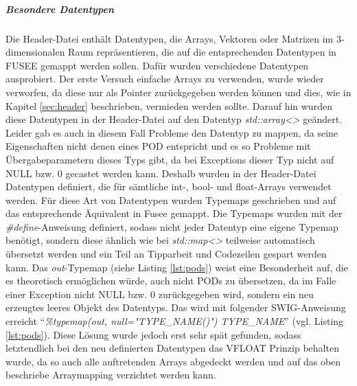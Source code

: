 \begin{code}[caption={inoreregex},label={lst:ignore}, escapechar=|]
\end{code}

\subparagraph{Besondere Datentypen} \label{besonderedatentypen}
Die Header-Datei enthält Datentypen, die Arrays, Vektoren oder Matrizen im 3-dimensionalen Raum repräsentieren, die auf die entsprechenden Datentypen in FUSEE gemappt werden sollen. Dafür wurden verschiedene Datentypen ausprobiert.
Der erste Versuch einfache Arrays zu verwenden, wurde wieder verworfen, da diese nur als Pointer zurückgegeben werden können und dies, wie in Kapitel \ref{sec:header} beschrieben, vermieden werden sollte. Darauf hin wurden diese Datentypen in der Header-Datei auf den Datentyp \emph{std::array<>} geändert. Leider gab es auch in diesem Fall Probleme den Datentyp zu mappen, da seine Eigenschaften nicht denen eines POD entspricht und es so Probleme mit Übergabeparametern dieses Typs gibt, da bei Exceptions dieser Typ nicht auf NULL bzw. 0 gecastet werden kann.
Deshalb wurden in der Header-Datei Datentypen definiert, die für sämtliche int-, bool- und float-Arrays verwendet werden. Für diese Art von Datentypen wurden Typemaps geschrieben und auf das entsprechende Äquivalent in Fusee gemappt. Die Typemaps wurden mit der \emph{\#define}-Anweisung definiert, sodass nicht jeder Datentyp eine eigene Typemap benötigt, sondern diese ähnlich wie bei \emph{std::map<>} teilweise automatisch übersetzt werden und ein Teil an Tipparbeit und Codezeilen gespart werden kann.
Das \emph{out}-Typemap (siehe Listing \ref{lst:pods}) weist eine Besonderheit auf, die es theoretisch ermöglichen würde, auch nicht PODs zu übersetzen, da im Falle einer Exception nicht NULL bzw. 0 zurückgegeben wird, sondern ein neu erzeugtes leeres Objekt des Datentyps. Das wird mit folgender SWIG-Anweisung erreicht \enquote{\emph{\%typemap(out, null="TYPE\_NAME()") TYPE\_NAME}} (vgl. Listing \ref{lst:pods}). Diese Lösung wurde jedoch erst sehr spät gefunden, sodass letztendlich bei den neu definierten Datentypen das VFLOAT Prinzip behalten wurde, da so auch alle auftretenden Arrays abgedeckt werden und auf das oben beschriebe Arraymapping verzichtet werden kann. 


